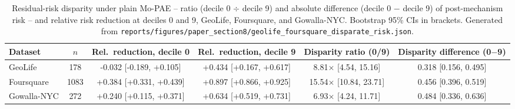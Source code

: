 \begin{table}[t]
\centering
\caption{Residual-risk disparity under plain Mo-PAE -- ratio (decile 0 $\div$ decile 9) and absolute difference (decile 0 $-$ decile 9) of post-mechanism risk -- and relative risk reduction at deciles 0 and 9, GeoLife, Foursquare, and Gowalla-NYC. Bootstrap 95\% CIs in brackets. Generated from \texttt{reports/figures/paper\_section8/geolife\_foursquare\_disparate\_risk.json}.}
\label{tab:main-disparate-risk}
\small
\begin{tabular}{@{}lccccc@{}}
\toprule
Dataset & $n$ & Rel.\ reduction, decile 0 & Rel.\ reduction, decile 9 & Disparity ratio (0/9) & Disparity difference (0$-$9) \\
\midrule
GeoLife & 178 & -0.032 [-0.189, +0.105] & +0.434 [+0.167, +0.617] & 8.81$\times$ [4.54, 15.16] & 0.318 [0.156, 0.495] \\
Foursquare & 1083 & +0.384 [+0.331, +0.439] & +0.897 [+0.866, +0.925] & 15.54$\times$ [10.84, 23.71] & 0.456 [0.396, 0.519] \\
Gowalla-NYC & 272 & +0.240 [+0.115, +0.371] & +0.634 [+0.519, +0.731] & 6.93$\times$ [4.24, 11.71] & 0.484 [0.336, 0.636] \\
\bottomrule
\end{tabular}
\end{table}
